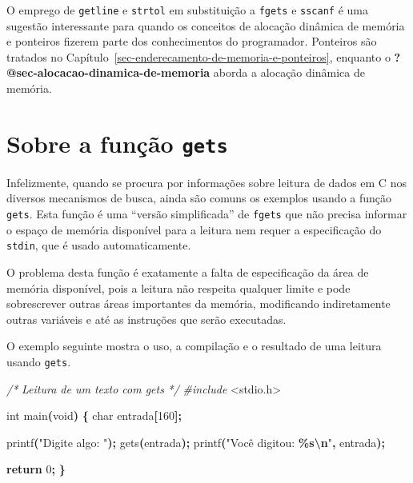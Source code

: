 \documentclass[
  11pt,
  a4paper,
]{scrbook}
\newenvironment{Shaded}{\begin{snugshade}}{\end{snugshade}}
\newcommand{\CommentTok}[1]{\textcolor[rgb]{0.56,0.35,0.01}{\textit{#1}}}
\newcommand{\ControlFlowTok}[1]{\textcolor[rgb]{0.13,0.29,0.53}{\textbf{#1}}}
\newcommand{\DataTypeTok}[1]{\textcolor[rgb]{0.13,0.29,0.53}{#1}}
\newcommand{\DecValTok}[1]{\textcolor[rgb]{0.00,0.00,0.81}{#1}}
\newcommand{\ImportTok}[1]{#1}
\newcommand{\NormalTok}[1]{#1}
\newcommand{\OperatorTok}[1]{\textcolor[rgb]{0.81,0.36,0.00}{\textbf{#1}}}
\newcommand{\PreprocessorTok}[1]{\textcolor[rgb]{0.56,0.35,0.01}{\textit{#1}}}
\newcommand{\SpecialCharTok}[1]{\textcolor[rgb]{0.81,0.36,0.00}{\textbf{#1}}}
\newcommand{\StringTok}[1]{\textcolor[rgb]{0.31,0.60,0.02}{#1}}
\begin{document}
O emprego de \texttt{getline} e \texttt{strtol} em substituição a
\texttt{fgets} e \texttt{sscanf} é uma sugestão interessante para quando
os conceitos de alocação dinâmica de memória e ponteiros fizerem parte
dos conhecimentos do programador. Ponteiros são tratados no
Capítulo~\ref{sec-enderecamento-de-memoria-e-ponteiros}, enquanto o
\textbf{?@sec-alocacao-dinamica-de-memoria} aborda a alocação dinâmica
de memória.

\section{\texorpdfstring{Sobre a função
\texttt{gets}}{Sobre a função gets}}\label{sobre-a-funuxe7uxe3o-gets}

 Infelizmente, quando se procura por
informações sobre leitura de dados em C nos diversos mecanismos de
busca, ainda são comuns os exemplos usando a função \texttt{gets}. Esta
função é uma ``versão simplificada'' de \texttt{fgets} que não precisa
informar o espaço de memória disponível para a leitura nem requer a
especificação do \texttt{stdin}, que é usado automaticamente.

O problema desta função é exatamente a falta de especificação da área de
memória disponível, pois a leitura não respeita qualquer limite e pode
sobrescrever outras áreas importantes da memória, modificando
indiretamente outras variáveis e até as instruções que serão executadas.

O exemplo seguinte mostra o uso, a compilação e o resultado de uma
leitura usando \texttt{gets}.

\begin{Shaded}
\begin{Highlighting}[]
\CommentTok{/*}
\CommentTok{Leitura de um texto com gets}
\CommentTok{*/}
\PreprocessorTok{\#include }\ImportTok{\textless{}stdio.h\textgreater{}}

\DataTypeTok{int}\NormalTok{ main}\OperatorTok{(}\DataTypeTok{void}\OperatorTok{)} \OperatorTok{\{}
    \DataTypeTok{char}\NormalTok{ entrada}\OperatorTok{[}\DecValTok{160}\OperatorTok{];}

\NormalTok{    printf}\OperatorTok{(}\StringTok{"Digite algo: "}\OperatorTok{);}
\NormalTok{    gets}\OperatorTok{(}\NormalTok{entrada}\OperatorTok{);}
\NormalTok{    printf}\OperatorTok{(}\StringTok{"Você digitou: \textquotesingle{}}\SpecialCharTok{\%s}\StringTok{\textquotesingle{}}\SpecialCharTok{\textbackslash{}n}\StringTok{"}\OperatorTok{,}\NormalTok{ entrada}\OperatorTok{);}

    \ControlFlowTok{return} \DecValTok{0}\OperatorTok{;}
\OperatorTok{\}}
\end{Highlighting}
\end{Shaded}
\end{document}
